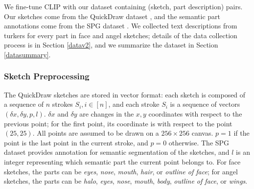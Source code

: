 

We fine-tune CLIP with our dataset containing (sketch, part description) pairs. Our sketches come from the QuickDraw dataset \citep{ha2017neural}, and the semantic part annotations come from the SPG dataset \citep{spg_paper}. We collected text descriptions from turkers for every part in face and angel sketches; details of the data collection process is in Section \ref{datav2}, and we summarize the dataset in Section \ref{datasummary}.  

\subsubsection*{Sketch Preprocessing} \label{sketch.preprocess}
The QuickDraw sketches are stored in vector format: each sketch is composed of a sequence of $n$ strokes $S_i, i \in [n]$, and each stroke $S_i$ is a sequence of vectors $(\delta x,\delta y, p, l)$. 
$\delta x$ and $\delta y$ are changes in the $x,y$ coordinates with respect to the previous point; for the first point, its coordinate is with respect to the point $(25,25)$. 
All points are assumed to be drawn on a $256 \times 256$ canvas. 
$p=1$ if the point is the last point in the current stroke, and $p=0$ otherwise. 
The SPG dataset provides annotation for semantic segmentation of the sketches, and $l$ is an integer representing which semantic part the current point belongs to. For face sketches, the parts can be \textit{eyes}, \textit{nose}, \textit{mouth}, \textit{hair}, or \textit{outline of face}; for angel sketches, the parts can be \textit{halo}, \textit{eyes}, \textit{nose}, \textit{mouth}, \textit{body}, \textit{outline of face}, or \textit{wings}.

